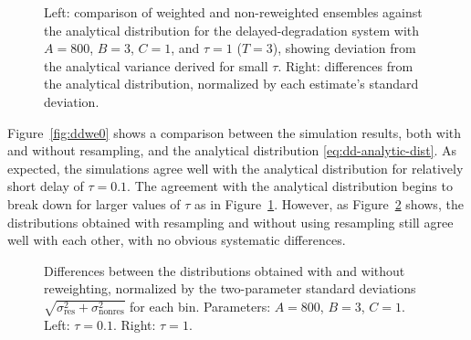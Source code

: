 \documentclass[english,letterpaper,12pt]{report}
\begin{document}
\begin{doublespacing}
\begin{figure}[tbp]
    \makebox[\linewidth][c]{
        \begin{subfigure}{3in}
            \begin{center}
                
            \end{center}
            \label{sfg:ddwe1-comp}
        \end{subfigure}
        \begin{subfigure}{3in}
            \begin{center}
                
            \end{center}
            \label{sfg:ddwe1-chi}
        \end{subfigure}
    }
    \caption{Left: comparison of weighted and non-reweighted ensembles against the analytical distribution for the delayed-degradation system with $A=800$, $B=3$, $C=1$, and $\tau=1$ ($T=3$), showing deviation from the analytical variance derived for small $\tau$. Right: differences from the analytical distribution, normalized by each estimate's standard deviation.}
    \label{fig:ddwe1}
\end{figure}

Figure~\ref{fig:ddwe0} shows a comparison between the simulation results, both with and without resampling, and the analytical distribution \eqref{eq:dd-analytic-dist}. As expected, the simulations agree well with the analytical distribution for relatively short delay of $\tau = 0.1$. The agreement with the analytical distribution begins to break down for larger values of $\tau$ as in Figure~\ref{fig:ddwe1}. However, as Figure~\ref{fig:ddwe-resdevs} shows, the distributions obtained with resampling and without using resampling still agree well with each other, with no obvious systematic differences. 

\begin{figure}[tbp]
    \makebox[\linewidth][c]{
        \begin{subfigure}{3in}
            \begin{center}
                
            \end{center}
            \label{sfg:ddwe-resdevs0}
        \end{subfigure}
        \begin{subfigure}{3in}
            \begin{center}
                
            \end{center}
            \label{sfg:ddwe-resdevs1}
        \end{subfigure}
    }
    \caption{Differences between the distributions obtained with and without reweighting, normalized by the two-parameter standard deviations $\sqrt{\sigma_\text{res}^2 + \sigma_\text{nonres}^2}$ for each bin. Parameters: $A=800$, $B=3$, $C=1$. Left: $\tau = 0.1$. Right: $\tau = 1$.}
    \label{fig:ddwe-resdevs}
\end{figure}


\end{doublespacing}
\end{document}
